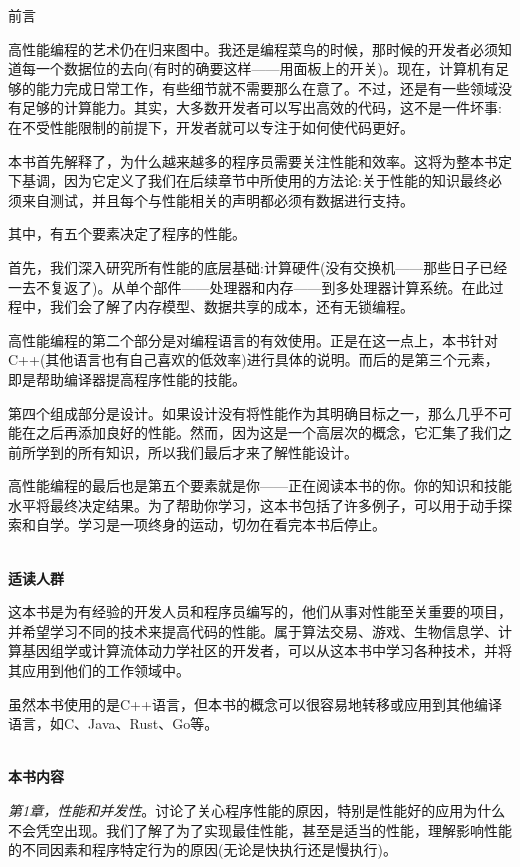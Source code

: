 \begin{flushright}
 前言
\end{flushright}

高性能编程的艺术仍在归来图中。我还是编程菜鸟的时候，那时候的开发者必须知道每一个数据位的去向(有时的确要这样——用面板上的开关)。现在，计算机有足够的能力完成日常工作，有些细节就不需要那么在意了。不过，还是有一些领域没有足够的计算能力。其实，大多数开发者可以写出高效的代码，这不是一件坏事:在不受性能限制的前提下，开发者就可以专注于如何使代码更好。

本书首先解释了，为什么越来越多的程序员需要关注性能和效率。这将为整本书定下基调，因为它定义了我们在后续章节中所使用的方法论:关于性能的知识最终必须来自测试，并且每个与性能相关的声明都必须有数据进行支持。

其中，有五个要素决定了程序的性能。

首先，我们深入研究所有性能的底层基础:计算硬件(没有交换机——那些日子已经一去不复返了)。从单个部件——处理器和内存——到多处理器计算系统。在此过程中，我们会了解了内存模型、数据共享的成本，还有无锁编程。

高性能编程的第二个部分是对编程语言的有效使用。正是在这一点上，本书针对C++(其他语言也有自己喜欢的低效率)进行具体的说明。而后的是第三个元素，即是帮助编译器提高程序性能的技能。

第四个组成部分是设计。如果设计没有将性能作为其明确目标之一，那么几乎不可能在之后再添加良好的性能。然而，因为这是一个高层次的概念，它汇集了我们之前所学到的所有知识，所以我们最后才来了解性能设计。

高性能编程的最后也是第五个要素就是你——正在阅读本书的你。你的知识和技能水平将最终决定结果。为了帮助你学习，这本书包括了许多例子，可以用于动手探索和自学。学习是一项终身的运动，切勿在看完本书后停止。

\hspace*{\fill} \\ %
\noindent\textbf{适读人群}

这本书是为有经验的开发人员和程序员编写的，他们从事对性能至关重要的项目，并希望学习不同的技术来提高代码的性能。属于算法交易、游戏、生物信息学、计算基因组学或计算流体动力学社区的开发者，可以从这本书中学习各种技术，并将其应用到他们的工作领域中。

虽然本书使用的是C++语言，但本书的概念可以很容易地转移或应用到其他编译语言，如C、Java、Rust、Go等。

\hspace*{\fill} \\ %
\textbf{本书内容}

\textit{第1章，性能和并发性}。讨论了关心程序性能的原因，特别是性能好的应用为什么不会凭空出现。我们了解了为了实现最佳性能，甚至是适当的性能，理解影响性能的不同因素和程序特定行为的原因(无论是快执行还是慢执行)。

